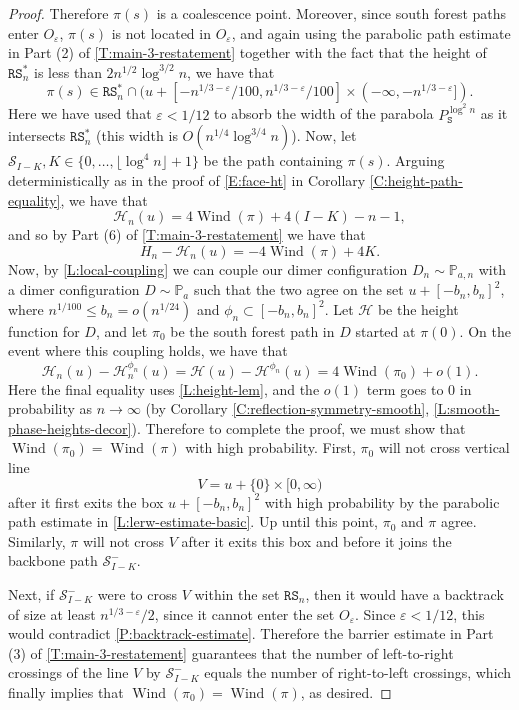 \documentclass[11pt,twoside]{amsart}
\theoremstyle{plain}
\numberwithin{quest}{section}
\theoremstyle{remark}
\numberwithin{rem}{section}
\theoremstyle{definition}
\newcommand{\eps}{\varepsilon}
\renewcommand{\P}{\mathbb{P}}
\newcommand{\cS}{\mathcal{S}}
\newcommand{\cH}{\mathcal{H}}
\renewcommand{\tt}[1]{{\mathtt{#1}}}
\begin{document}
\begin{proof}
Therefore $\pi(s)$ is a coalescence point. Moreover, since south forest paths enter $O_\eps$, $\pi(s)$ is not located in $O_\eps$, and again using the parabolic path estimate in Part (2) of \cref{T:main-3-restatement} together with the fact that the height of $\tt{RS}_n^*$ is less than $2n^{1/2} \log^{3/2} n$, we have that
$$
\pi(s) \in \tt{RS}_n^* \cap (u + [-n^{1/3 - \eps}/100, n^{1/3 - \eps}/100] \times (-\infty, -n^{1/3 - \eps}]).
$$
Here we have used that $\eps < 1/12$ to absorb the width of the parabola $P^{\log^2 n}_\tt{S}$ as it intersects $\tt{RS}_n^*$ (this width is $O(n^{1/4} \log^{3/4} n)$). Now, let $\cS_{I-K}, K \in \{0, \dots, \lfloor \log^4 n \rfloor + 1\}$ be the path containing $\pi(s)$. Arguing deterministically as in the proof of \eqref{E:face-ht} in Corollary \ref{C:height-path-equality}, we have that
$$
\cH_n(u) = 4 \operatorname{Wind}(\pi) + 4(I-K) - n - 1,
$$ 
and so by Part (6) of \cref{T:main-3-restatement} we have that
$$
H_n - \cH_n(u) = - 4 \operatorname{Wind}(\pi) + 4 K.
$$
Now, by \cref{L:local-coupling} we can couple our dimer configuration $D_n \sim \P_{a, n}$ with a dimer configuration $D \sim \P_a$ such that the two agree on the set $u + [-b_n, b_n]^2$, where $n^{1/100} \le b_n = o(n^{1/24})$ and $\phi_n \subset [-b_n, b_n]^2$. Let $\cH$ be the height function for $D$, and let $\pi_0$ be the south forest path in $D$ started at $\pi(0)$. On the event where this coupling holds, we have that 
$$
\cH_n(u) - \cH_n^{\phi_n} (u)= \cH(u) - \cH^{\phi_n} (u) = 4 \operatorname{Wind}(\pi_0) + o(1).
$$
Here the final equality uses \cref{L:height-lem}, and the $o(1)$ term goes to $0$ in probability as $n \to \infty$ (by Corollary \ref{C:reflection-symmetry-smooth}, \cref{L:smooth-phase-heights-decor}). Therefore to complete the proof, we must show that $\operatorname{Wind}(\pi_0) = \operatorname{Wind}(\pi)$ with high probability. First, $\pi_0$ will not cross vertical line 
$$
V = u + \{0\} \times [0, \infty)
$$
after it first exits the box $u + [-b_n, b_n]^2$ with high probability by the parabolic path estimate in \cref{L:lerw-estimate-basic}. Up until this point, $\pi_0$ and $\pi$ agree. Similarly, $\pi$ will not cross $V$ after it exits this box and before it joins the backbone path $\cS_{I-K}^-$. 

Next, if $\cS_{I-K}^-$ were to cross $V$ within the set $\tt{RS}_n$, then it would have a backtrack of size at least $n^{1/3 - \eps}/2$, since it cannot enter the set $O_\eps$. Since $\eps < 1/12$, this would contradict \cref{P:backtrack-estimate}. Therefore the barrier estimate in Part (3) of \cref{T:main-3-restatement} guarantees that the number of left-to-right crossings of the line $V$ by $\cS_{I-K}^-$ equals the number of right-to-left crossings, which finally implies that $\operatorname{Wind}(\pi_0) = \operatorname{Wind}(\pi)$, as desired.
	\end{proof}
	
\end{document}
